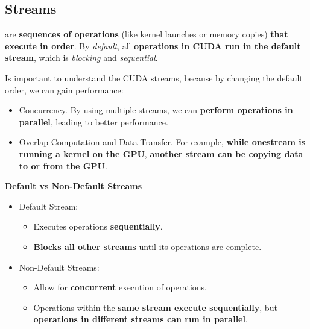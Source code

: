 \subsection{Streams}

 are \textbf{sequences of operations} (like kernel launches or memory copies) \textbf{that execute in order}. By \emph{default}, all \textbf{operations in CUDA run in the default stream}, which is \emph{blocking} and \emph{sequential}.

\highspace
Is important to understand the CUDA streams, because by changing the default order, we can gain performance:
\begin{itemize}
    \item Concurrency. By using multiple streams, we can \textbf{perform operations in parallel}, leading to better performance.
    \item Overlap Computation and Data Transfer. For example, \textbf{while one\break stream is running a kernel on the GPU}, \textbf{another stream can be copying data to or from the GPU}.
\end{itemize}

\highspace
\begin{flushleft}
    \textcolor{Green3}{ \textbf{Default vs Non-Default Streams}}
\end{flushleft}
\begin{itemize}
    \item Default Stream:
    \begin{itemize}
        \item Executes operations \textbf{sequentially}.
        \item \textbf{Blocks all other streams} until its operations are complete.
    \end{itemize}

    \item Non-Default Streams:
    \begin{itemize}
        \item Allow for \textbf{concurrent} execution of operations.
        \item Operations within the \textbf{same stream execute sequentially}, but \textbf{operations in different streams can run in parallel}.
    \end{itemize}
\end{itemize}

